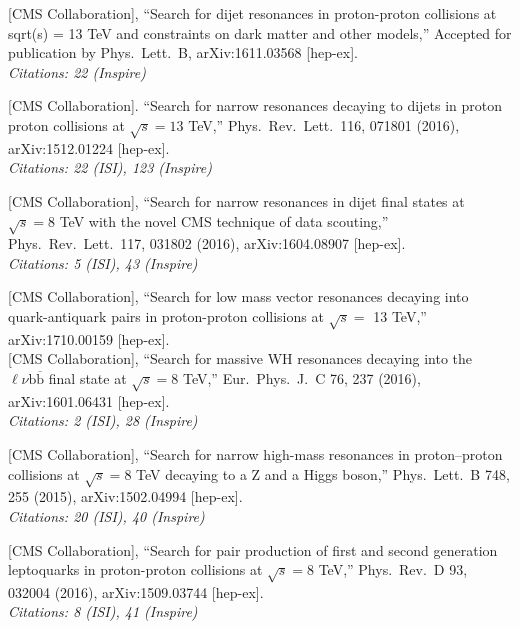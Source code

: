 \documentclass[10pt, a4paper]{article}
\begin{document}
\begin{thebibliography}{599}

  [CMS Collaboration],
  ``Search for dijet resonances in proton-proton collisions at sqrt(s) = 13 TeV and constraints on dark matter and other models,''
  Accepted for publication by Phys.\ Lett.\ B, arXiv:1611.03568
  [hep-ex]. \\
\emph{Citations: 22 (Inspire)}

  [CMS Collaboration].
  ``Search for narrow resonances decaying to 
  dijets in proton proton
  collisions at $\sqrt{s}=13$ TeV,''
  Phys.\ Rev.\ Lett.\  116, 071801 (2016), arXiv:1512.01224 [hep-ex]. \\
\emph{Citations: 22 (ISI), 123
  (Inspire)}

[CMS Collaboration],
  ``Search for narrow resonances in dijet final states at $\sqrt{s}=8$
  TeV with the novel CMS technique of data scouting,''
  Phys.\ Rev.\ Lett.\  117, 031802 (2016), arXiv:1604.08907 [hep-ex]. \\
\emph{Citations: 5 (ISI), 43 (Inspire)}

 [CMS Collaboration],
  ``Search for low mass vector resonances decaying into
  quark-antiquark pairs in proton-proton collisions at $\sqrt{s} = $
  13 TeV,'' arXiv:1710.00159 [hep-ex].\\

[CMS Collaboration],
  ``Search for massive WH resonances decaying into the $\ell \nu \mathrm{b} \overline{\mathrm{b}} $ final state at $\sqrt{s}=8$ TeV,''
  Eur.\ Phys.\ J.\ C 76, 237 (2016), arXiv:1601.06431 [hep-ex]. \\
\emph{Citations: 2 (ISI), 28 (Inspire)}

 [CMS Collaboration],
  ``Search for narrow high-mass resonances in proton–proton collisions
  at $\sqrt{s}=8$ TeV decaying to a Z and a Higgs boson,''
  Phys.\ Lett.\ B 748, 255 (2015), arXiv:1502.04994 [hep-ex].\\
\emph{Citations: 20 (ISI), 40 (Inspire)}

[CMS Collaboration],
  ``Search for pair production of first and second generation
  leptoquarks in proton-proton collisions at $\sqrt{s}=8$ TeV,''
  Phys.\ Rev.\ D  93, 032004 (2016), arXiv:1509.03744 [hep-ex].\\
\emph{Citations: 8 (ISI), 41 (Inspire)}


\end{thebibliography}
\end{document}
